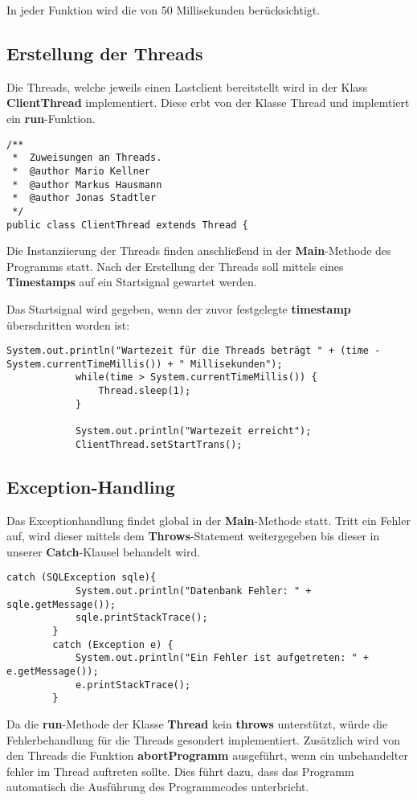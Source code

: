 In jeder Funktion wird die  von 50 Millisekunden berücksichtigt.

\subsection{Erstellung der Threads}

Die Threads, welche jeweils einen Lastclient bereitstellt wird in der Klass
\textbf{ClientThread} implementiert. Diese erbt von der Klasse Thread und
implemtiert ein \textbf{run}-Funktion.

\begin{lstlisting}[caption={Ausschnitt aus ClientThread}]
/**
 *  Zuweisungen an Threads.
 *  @author Mario Kellner
 *	@author Markus Hausmann
 *  @author Jonas Stadtler
 */
public class ClientThread extends Thread {
\end{lstlisting}

Die Instanziierung der Threads finden anschließend in der
\textbf{Main}-Methode des Programms statt. Nach der Erstellung der Threads
soll mittels eines \textbf{Timestamps} auf ein Startsignal gewartet werden.


Das Startsignal wird gegeben, wenn der zuvor festgelegte \textbf{timestamp}
überschritten worden ist:

\begin{lstlisting}[caption={Wartezeit}]
		    System.out.println("Wartezeit für die Threads beträgt " + (time - System.currentTimeMillis()) + " Millisekunden");
		    while(time > System.currentTimeMillis()) {
		    	Thread.sleep(1);
		    }
		    
		    System.out.println("Wartezeit erreicht");
		    ClientThread.setStartTrans();
\end{lstlisting}


\subsection{Exception-Handling}

Das Exceptionhandlung findet global in der \textbf{Main}-Methode statt. Tritt
ein Fehler auf, wird dieser mittels dem \textbf{Throws}-Statement 
weitergegeben bis dieser in unserer \textbf{Catch}-Klausel behandelt wird.

\begin{lstlisting}[caption={Catch-Block}]
		catch (SQLException sqle){
			System.out.println("Datenbank Fehler: " + sqle.getMessage());
			sqle.printStackTrace();
		}
 		catch (Exception e) {
			System.out.println("Ein Fehler ist aufgetreten: " + e.getMessage());
			e.printStackTrace();
		}
\end{lstlisting}

Da die \textbf{run}-Methode der Klasse \textbf{Thread} kein \textbf{throws}
unterstützt, würde die Fehlerbehandlung für die Threads gesondert implementiert.
Zusätzlich wird von den Threads die Funktion \textbf{abortProgramm}
ausgeführt, wenn ein unbehandelter fehler im Thread auftreten sollte. Dies führt
dazu, dass das Programm automatisch die Ausführung des Programmcodes
unterbricht.

\clearpage